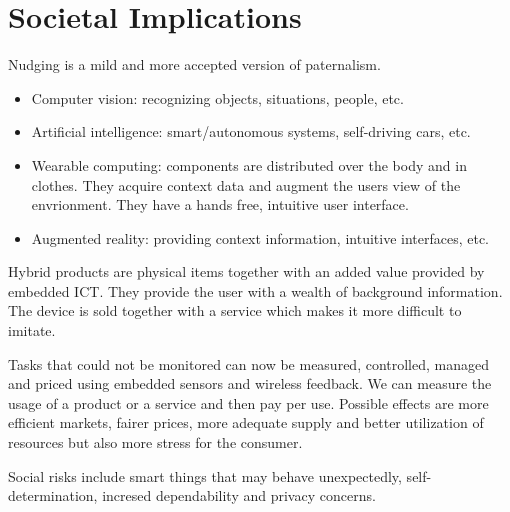 \section{Societal Implications}
\begin{mytitle}[Nudging] Nudging is a mild and more accepted version of paternalism.
\end{mytitle}
\begin{mytitle}\hfill
\begin{itemize}
    \item Computer vision: recognizing objects, situations, people, etc.
    \item Artificial intelligence: smart/autonomous systems, self-driving cars, etc.
    \item Wearable computing: components are distributed over the body and in clothes. They acquire context data and augment the users view of the envrionment. They have a hands free, intuitive user interface.
    \item Augmented reality: providing context information, intuitive interfaces, etc.
\end{itemize}
\end{mytitle}
\begin{mytitle} Hybrid products are physical items together with an added value provided by embedded ICT. They provide the user with a wealth of background information. The device is sold together with a service which makes it more difficult to imitate.
\end{mytitle}
\begin{mytitle} Tasks that could not be monitored can now be measured, controlled, managed and priced using embedded sensors and wireless feedback. We can measure the usage of a product or a service and then pay per use. Possible effects are more efficient markets, fairer prices, more adequate supply and better utilization of resources but also more stress for the consumer.
\end{mytitle}
\begin{mytitle} Social risks include smart things that may behave unexpectedly, self-determination, incresed dependability and privacy concerns.
\end{mytitle}